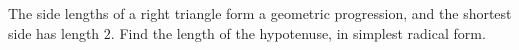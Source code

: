 The side lengths of a right triangle form a geometric progression, and the shortest side has length $2$. Find the length of the hypotenuse, in simplest radical form.
